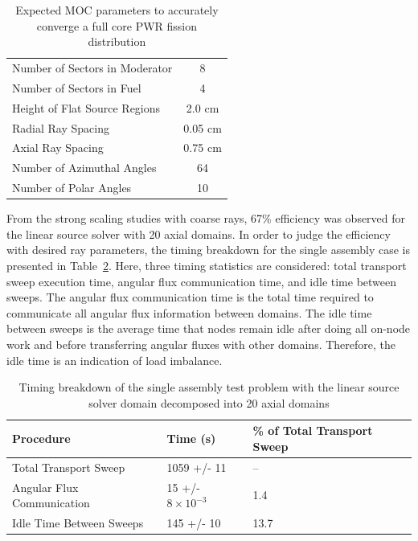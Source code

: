 \begin{table}[ht]
	\centering
	\caption{Expected MOC parameters to accurately converge a full core PWR fission distribution}
	\medskip
	\begin{tabular}{lc}
		\hline
		Number of Sectors in Moderator & 8 \\
		Number of Sectors in Fuel & 4 \\
		Height of Flat Source Regions & 2.0 cm \\
		Radial Ray Spacing & 0.05 cm \\
		Axial Ray Spacing & 0.75 cm \\
		Number of Azimuthal Angles & 64 \\
		Number of Polar Angles & 10 \\
		\hline
	\end{tabular}
	\label{tab:expected-moc-params}
\end{table}

From the strong scaling studies with coarse rays, 67\% efficiency was observed for the linear source solver with 20 axial domains. In order to judge the efficiency with desired ray parameters, the timing breakdown for the single assembly case is presented in Table~\ref{tab:dd-sa-breakdown}. Here, three timing statistics are considered: total transport sweep execution time, angular flux communication time, and idle time between sweeps. The angular flux communication time is the total time required to communicate all angular flux information between domains. The idle time between sweeps is the average time that nodes remain idle after doing all on-node work and before transferring angular fluxes with other domains. Therefore, the idle time is an indication of load imbalance.

\begin{table}[ht]
	\centering
	\caption{Timing breakdown of the single assembly test problem with the linear source solver domain decomposed into 20 axial domains}
	\medskip
	\begin{tabular}{l|l|l}
		Procedure & Time (s)  & \% of Total Transport Sweep \\
		\hline
		\hline
		Total Transport Sweep & 1059 +/- 11 & -- \\
		\hline
		Angular Flux Communication & 15 +/- $8 \times 10^{-3}$ & 1.4 \\
		Idle Time Between Sweeps & 145 +/- 10 & 13.7 \\
		\hline
	\end{tabular}
	\label{tab:dd-sa-breakdown}
\end{table}

